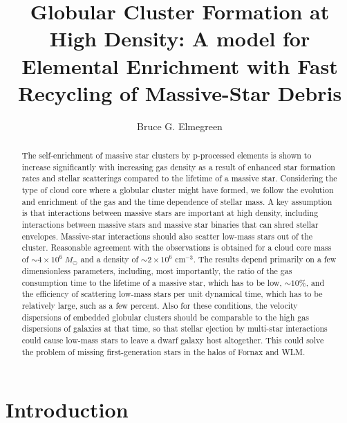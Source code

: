 \documentclass[12pt,preprint]{aastex}
\begin{document}
\title{Globular Cluster Formation at High Density:
A model for Elemental Enrichment with Fast Recycling of Massive-Star Debris}

\author{Bruce G. Elmegreen}


\begin{abstract}
The self-enrichment of massive star clusters by p-processed elements is shown to
increase significantly with increasing gas density as a result of enhanced star
formation rates and stellar scatterings compared to the lifetime of a massive star.
Considering the type of cloud core where a globular cluster might have formed, we
follow the evolution and enrichment of the gas and the time dependence of stellar
mass. A key assumption is that interactions between massive stars are important at
high density, including interactions between massive stars and massive star
binaries that can shred stellar envelopes. Massive-star interactions should also
scatter low-mass stars out of the cluster. Reasonable agreement with the
observations is obtained for a cloud core mass of $\sim4\times10^6\;M_\odot$ and a
density of $\sim2\times10^6$ cm$^{-3}$. The results depend primarily on a few
dimensionless parameters, including, most importantly, the ratio of the gas
consumption time to the lifetime of a massive star, which has to be low,
$\sim10$\%, and the efficiency of scattering low-mass stars per unit dynamical
time, which has to be relatively large, such as a few percent. Also for these
conditions, the velocity dispersions of embedded globular clusters should be
comparable to the high gas dispersions of galaxies at that time, so that stellar
ejection by multi-star interactions could cause low-mass stars to leave a dwarf
galaxy host altogether. This could solve the problem of missing first-generation
stars in the halos of Fornax and WLM.
\end{abstract}


\section{Introduction}
\label{intro}
\end{document}
